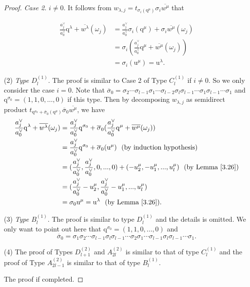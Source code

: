 \documentclass[11pt]{amsart}
\theoremstyle{plain}
\numberwithin{equation}{subsection}
\newcommand{\lam}{\lambda}
\begin{document}
\begin{proof}
{\em Case 2.} $i\neq 0$. It follows from $w_{\lam, j}=t_{\sigma_i(\mathrm{q}^{\mu})}\sigma_i\overline{w^{\mu}}$ that

\begin{align*}
\frac{a_j^{\vee}}{a_0^{\vee}}\mathrm{q}^\lam+\overline{w^\lam}(\omega_{j})
&=\frac{a_j^{\vee}}{a_0^{\vee}}\sigma_i(\mathrm{q}^{\mu})+\sigma_i\overline{w^{\mu}}(\omega_{j})\\
&=\sigma_i(\frac{a_j^{\vee}}{a_0^{\vee}}\mathrm{q}^{\mu}+\overline{w^{\mu}}(\omega_{j}))\\
&=\sigma_i(\mathrm{u}^\mu)=\mathrm{u}^\lam.
\end{align*}

\noindent (2) {\em Type $D_{l}^{(1)}.$} The proof is similar to Case 2 of Type $C_l^{(1)}$ if $i\neq 0$. So we only consider the case $i=0$. 
Note that $\overline{\sigma}_0=\sigma_2 \cdots \sigma_{l-1}\sigma_1 \cdots \sigma_{l-2}\sigma_l\sigma_{l-1} \cdots \sigma_1\sigma_{l-1} \cdots \sigma_1$
and $\mathrm{q}^{\sigma_0}=(1, 1, 0, \dots, 0)$ if this type. 
Then by decomposing $w_{\lam, j}$ as semidirect product $t_{\mathrm{q}^{\sigma_0}+\overline{\sigma}_0(\mathrm{q}^{\mu})}\overline{\sigma}_0\overline{w^{\mu}}$,
we have
\begin{align*}
\frac{a_j^{\vee}}{a_0^{\vee}}\mathrm{q}^\lam+\overline{w^\lam}(\omega_{j})
&=\frac{a_j^{\vee}}{a_0^{\vee}}\mathrm{q}^{\sigma_0}+\overline{\sigma}_0(\frac{a_j^{\vee}}{a_0^{\vee}}\mathrm{q}^{\mu}+\overline{w^{\mu}}(\omega_{j})) \\
& =\frac{a_j^{\vee}}{a_0^{\vee}}\mathrm{q}^{\sigma_0}+\overline{\sigma}_0(\mathrm{u}^\mu)\,\,\,\,   \text{(by induction hypothesis)}\\
&=(\frac{a_j^{\vee}}{a_0^{\vee}},\frac{a_j^{\vee}}{a_0^{\vee}},0,...,0)+(-u_{2}^\mu,-u_{1}^\mu,...,u_{l}^\mu) \,\,\,\,   \text{(by Lemma \ref{3.26})}\\
&=(\frac{a_j^{\vee}}{a_0^{\vee}}-u_{2}^\mu,\frac{a_j^{\vee}}{a_0^{\vee}}-u_{1}^\mu,...,u_{l}^\mu)\\
&=\sigma_0\mathrm{u}^{\mu}=\mathrm{u}^\lam\,\,\,\,   \text{(by Lemma \ref{3.26})}.
\end{align*}
	
\noindent (3) {\em Type $B_l^{(1)}.$} The proof is similar to type $D_l^{(1)}$ and the details is omitted.  
We only want to point out here that $\mathrm{q}^{\sigma_0}=(1, 1, 0, \dots, 0)$ 
and $$\overline{\sigma}_0=\sigma_1\sigma_2 \cdots \sigma_{l-1}\sigma_l\sigma_{l-1}\cdots \sigma_2
\sigma_1 \cdots \sigma_{l-1}\sigma_l\sigma_{l-1}\cdots \sigma_1.$$ 
	
\noindent (4) The proof of Types $D_{l+1}^{(2)}$ and $A_{2l}^{(2)}$ is similar to that of type $C_l^{(1)}$
and the proof of Type $A_{2l-1}^{(2)}$ is similar to that of type $B_l^{(1)}$.

The proof if completed.
\end{proof}
\end{document}

